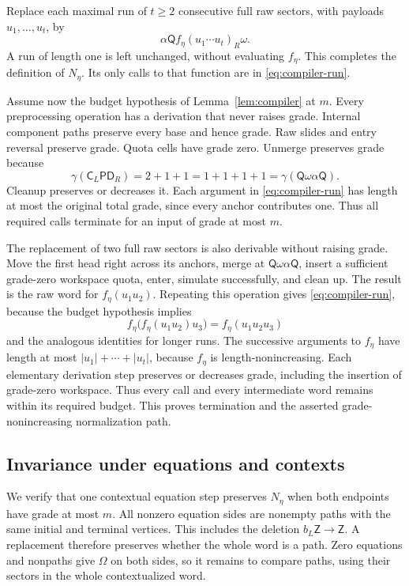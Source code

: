 Replace each maximal run of $t\geq2$ consecutive full raw sectors,
with payloads $u_1,\ldots,u_t$, by
\begin{equation}\label{eq:compiler-run}
\alpha\mathsf Q f_\eta(u_1\cdots u_t)_R\omega.
\end{equation}
A run of length one is left unchanged, without evaluating $f_\eta$.
This completes the definition of $N_\eta$. Its only calls to that
function are in \eqref{eq:compiler-run}.

Assume now the budget hypothesis of Lemma~\ref{lem:compiler} at $m$.
Every preprocessing operation has a derivation that never raises grade.
Internal component paths preserve every base and hence grade. Raw slides
and entry reversal preserve grade. Quota cells have grade zero. Unmerge
preserves grade because
\[
\gamma(\mathsf C_L\mathsf P\mathsf D_R)=2+1+1
=1+1+1+1=\gamma(\mathsf Q\omega\alpha\mathsf Q).
\]
Cleanup preserves or decreases it. Each argument in
\eqref{eq:compiler-run} has length at most the original total grade,
since every anchor contributes one. Thus all required calls terminate
for an input of grade at most $m$.

The replacement of two full raw sectors is also derivable without
raising grade. Move the first head right across its anchors, merge at
$\mathsf Q\omega\alpha\mathsf Q$, insert a sufficient grade-zero
workspace quota, enter, simulate successfully, and clean up. The result
is the raw word for $f_\eta(u_1u_2)$. Repeating this operation gives
\eqref{eq:compiler-run}, because the budget hypothesis implies
\[
f_\eta\bigl(f_\eta(u_1u_2)u_3\bigr)
=f_\eta(u_1u_2u_3)
\]
and the analogous identities for longer runs. The successive arguments
to $f_\eta$ have length at most $|u_1|+\cdots+|u_t|$, because
$f_\eta$ is length-nonincreasing. Each elementary derivation step
preserves or decreases grade, including the insertion of grade-zero
workspace. Thus every call and every intermediate word remains within
its required budget. This proves termination and the asserted
grade-nonincreasing normalization path.

\subsection{Invariance under equations and contexts}

We verify that one contextual equation step preserves $N_\eta$ when
both endpoints have grade at most $m$. All nonzero equation sides are
nonempty paths with the same initial and terminal vertices. This
includes the deletion $b_L\mathsf Z\to\mathsf Z$. A replacement
therefore preserves whether the whole word is a path. Zero equations
and nonpaths give $\Omega$ on both sides, so it remains to compare paths,
using their sectors in the whole contextualized word.


